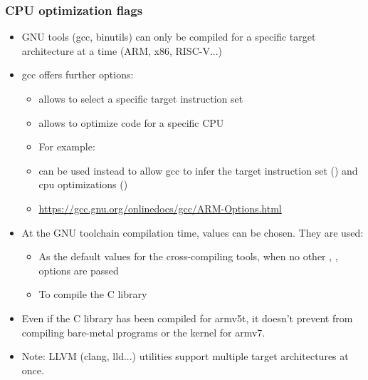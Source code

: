 \begin{frame}
  \frametitle{CPU optimization flags}
  \begin{itemize}
  \item GNU tools (gcc, binutils) can only be compiled for a specific
        target architecture at a time (ARM, x86, RISC-V...)
  \item gcc offers further options:
    \begin{itemize}
    \item {} allows to select a specific target instruction set
    \item {} allows to optimize code for a specific CPU
    \item For example: 
    \item {} can be used instead to allow gcc to infer the target
      instruction set () and cpu optimizations ()
    \item \url{https://gcc.gnu.org/onlinedocs/gcc/ARM-Options.html}
    \end{itemize}
  \item At the GNU toolchain compilation time, values can be chosen. They are used:
    \begin{itemize}
    \item As the default values for the cross-compiling tools, when no
      other , ,  options are
      passed
    \item To compile the C library
    \end{itemize}
  \item Even if the C library has been compiled for armv5t, it doesn't
    prevent from compiling bare-metal programs or the kernel for armv7.
  \item Note: LLVM (clang, lld...) utilities support multiple target architectures at once.
  \end{itemize}
\end{frame}
